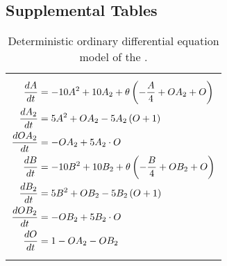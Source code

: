 %
%
%
%

\continuesupplemental

\subsection{Supplemental Tables}
\begin{table}[h]
    \caption{\label{tab:gts_odes}Deterministic ordinary differential equation model of the \gtsabbrev{}.}
    \begin{tabularx}{\textwidth}{Z}
        \hline\hline
         \\
        \hline
        {\begin{align*}
            \frac{dA}{dt}   &= -10 A^2 + 10 A_2 + \theta \left( -\frac{A}{4} + OA_2 + O \right) \\
            \frac{dA_2}{dt}  &= 5 A^2 + OA_2 - 5 A_2 \left( O + 1 \right)                            \\
            \frac{dOA_2}{dt} &= -OA_2 + 5 A_2 \cdot O                                                    \\
            \frac{dB}{dt}   &= -10 B^2 + 10 B_2 + \theta \left( -\frac{B}{4} + OB_2 + O \right) \\
            \frac{dB_2}{dt}  &= 5 B^2 + OB_2 - 5 B_2 \left( O + 1 \right)                            \\
            \frac{dOB_2}{dt} &= -OB_2 + 5 B_2 \cdot O                                                    \\
            \frac{dO}{dt}   &= 1 - OA_2 - OB_2
        \end{align*}} \\
        \hline\hline
    \end{tabularx}
\end{table}
\clearpage

%
